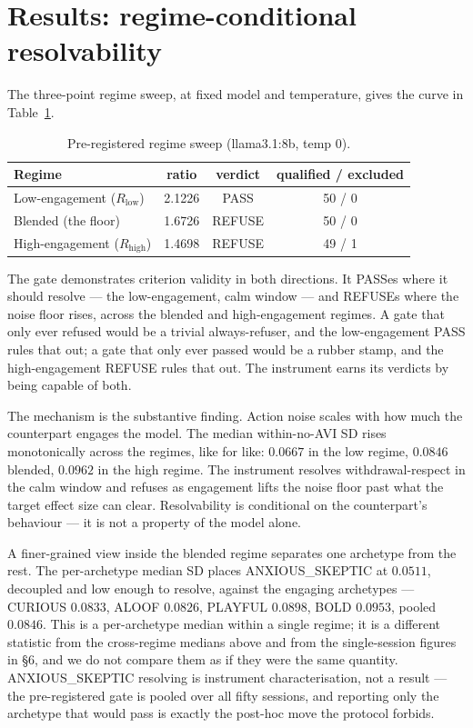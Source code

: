 \documentclass{article}
\begin{document}
\section{Results: regime-conditional resolvability}

The three-point regime sweep, at fixed model and temperature, gives the curve in Table~\ref{tab:sweep}.

\begin{table}[t]
\centering
\caption{Pre-registered regime sweep (llama3.1:8b, temp 0).}
\label{tab:sweep}
\begin{tabular}{lccc}
\toprule
Regime & ratio & verdict & qualified / excluded \\
\midrule
Low-engagement ($R_{\mathrm{low}}$) & 2.1226 & PASS & 50 / 0 \\
Blended (the floor) & 1.6726 & REFUSE & 50 / 0 \\
High-engagement ($R_{\mathrm{high}}$) & 1.4698 & REFUSE & 49 / 1 \\
\bottomrule
\end{tabular}
\end{table}

The gate demonstrates criterion validity in both directions. It PASSes where it should resolve --- the low-engagement, calm window --- and REFUSEs where the noise floor rises, across the blended and high-engagement regimes. A gate that only ever refused would be a trivial always-refuser, and the low-engagement PASS rules that out; a gate that only ever passed would be a rubber stamp, and the high-engagement REFUSE rules that out. The instrument earns its verdicts by being capable of both.

The mechanism is the substantive finding. Action noise scales with how much the counterpart engages the model. The median within-no-AVI SD rises monotonically across the regimes, like for like: $0.0667$ in the low regime, $0.0846$ blended, $0.0962$ in the high regime. The instrument resolves withdrawal-respect in the calm window and refuses as engagement lifts the noise floor past what the target effect size can clear. Resolvability is conditional on the counterpart's behaviour --- it is not a property of the model alone.

A finer-grained view inside the blended regime separates one archetype from the rest. The per-archetype median SD places ANXIOUS\_SKEPTIC at $0.0511$, decoupled and low enough to resolve, against the engaging archetypes --- CURIOUS $0.0833$, ALOOF $0.0826$, PLAYFUL $0.0898$, BOLD $0.0953$, pooled $0.0846$. This is a per-archetype median within a single regime; it is a different statistic from the cross-regime medians above and from the single-session figures in §6, and we do not compare them as if they were the same quantity. ANXIOUS\_SKEPTIC resolving is instrument characterisation, not a result --- the pre-registered gate is pooled over all fifty sessions, and reporting only the archetype that would pass is exactly the post-hoc move the protocol forbids.
\end{document}
